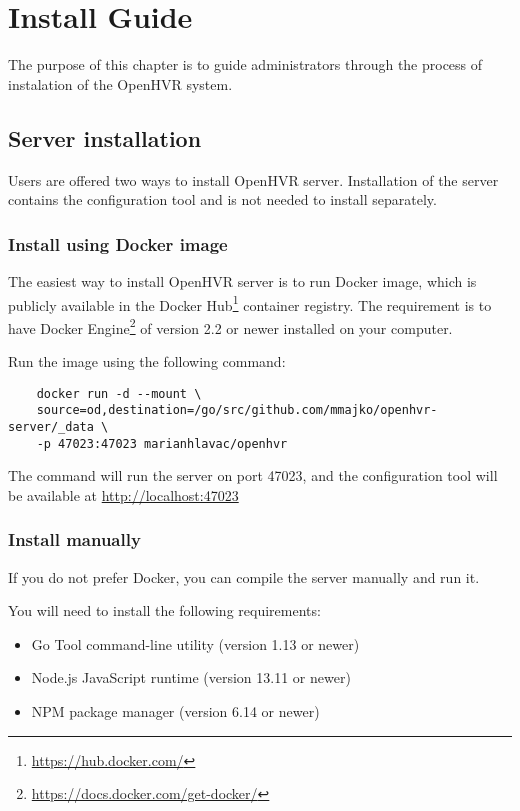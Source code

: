 \chapter{Install Guide}\label{installguide}

The purpose of this chapter is to guide administrators through the process
of instalation of the OpenHVR system.

\section*{Server installation}

Users are offered two ways to install OpenHVR server. Installation of the
server contains the configuration tool and is not needed to install separately.

\subsection*{Install using Docker image}

The easiest way to install OpenHVR server is to run Docker image, which is
publicly available in the Docker Hub\footnote{\href{https://hub.docker.com/}{https://hub.docker.com/}}
container registry. The requirement is to have Docker 
Engine\footnote{\href{https://docs.docker.com/get-docker/}{https://docs.docker.com/get-docker/}} of version 2.2 or
newer installed on your computer. 

Run the image using the following command:

\begin{verbatim}
    docker run -d --mount \
    source=od,destination=/go/src/github.com/mmajko/openhvr-server/_data \
    -p 47023:47023 marianhlavac/openhvr
\end{verbatim}

The command will run the server on port 47023, and the configuration tool will
be available at \href{http://localhost:47023}{http://localhost:47023}

\subsection*{Install manually}

If you do not prefer Docker, you can compile the server manually and run it.

You will need to install the following requirements:

\begin{itemize}
    \itemsep0em
    \item Go Tool command-line utility (version 1.13 or newer)
    \item Node.js JavaScript runtime (version 13.11 or newer) 
    \item NPM package manager (version 6.14 or newer)
\end{itemize}

